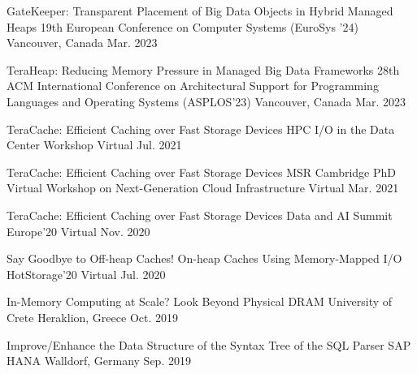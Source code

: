 

\begin{cvhonors}
  \cvhonor
    {GateKeeper: Transparent Placement of Big Data Objects in Hybrid Managed
    Heaps} %
    {19th European Conference on Computer Systems (EuroSys '24)} %
    {Vancouver, Canada} %
    {Mar. 2023} %

  \cvhonor
    {TeraHeap: Reducing Memory Pressure in Managed Big Data Frameworks} %
    {28th ACM International Conference on Architectural Support for Programming
    Languages and Operating Systems (ASPLOS'23)} %
    {Vancouver, Canada} %
    {Mar. 2023} %

  \cvhonor
    {TeraCache: Efficient Caching over Fast Storage Devices} %
    {HPC I/O in the Data Center Workshop} %
    {Virtual} %
    {Jul. 2021} %

  \cvhonor
    {TeraCache: Efficient Caching over Fast Storage Devices} %
    {MSR Cambridge PhD Virtual Workshop on Next-Generation Cloud Infrastructure} %
    {Virtual} %
    {Mar. 2021} %

  \cvhonor
    {TeraCache: Efficient Caching over Fast Storage Devices} %
    {Data and AI Summit Europe'20} %
    {Virtual} %
    {Nov. 2020} %

  \cvhonor
    {Say Goodbye to Off-heap Caches! On-heap Caches Using Memory-Mapped I/O} %
    {HotStorage'20} %
    {Virtual} %
    {Jul. 2020} %

  \cvhonor
    {In-Memory Computing at Scale? Look Beyond Physical DRAM} %
    {University of Crete} %
    {Heraklion, Greece} %
    {Oct. 2019} %

  \cvhonor
    {Improve/Enhance the Data Structure of the Syntax Tree of the SQL Parser} %
    {SAP HANA} %
    {Walldorf, Germany} %
    {Sep. 2019} %



\end{cvhonors}
